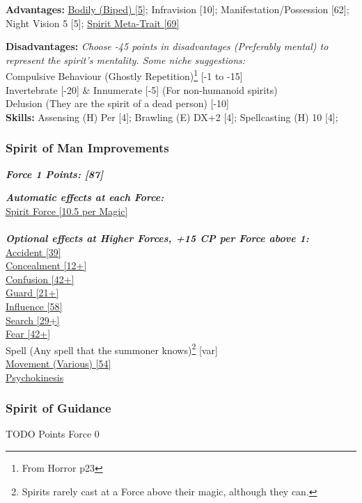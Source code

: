 \begin{multicols*}{3}
	\textbf{Advantages:}
	\hyperref[bodily]{Bodily (Biped) [5]}; Infravision [10]; Manifestation/Possession [62]; Night Vision 5 [5];  \hyperref[spirit_meta_trait]{Spirit Meta-Trait [69]}
	
	\textbf{Disadvantages:}
	\textit{Choose -45 points in disadvantages (Preferably mental) to represent the spirit's mentality. Some niche suggestions:\\}
	Compulsive Behaviour (Ghostly Repetition)\footnote{From Horror p23} [-1 to -15]\\
	Invertebrate [-20] \& Innumerate [-5] (For non-humanoid spirits)\\
	Delusion (They are the spirit of a dead person) [-10]\\
	
	\textbf{Skills:}
	Assensing (H) Per [4]; Brawling (E) DX+2 [4]; Spellcasting (H) 10 [4];
	
	\subsubsection*{Spirit of Man Improvements}
	
	\textbf{\textit{Force 1 Points: [87]}}
	
	\textbf{\textit{Automatic effects at each Force:\\}}
	\hyperref[spirit_force]{Spirit Force [10.5 per Magic]}\\\\
	
	\textbf{\textit{Optional effects at Higher Forces, +15 CP per Force above 1:\\}}
	\hyperref[accident]{Accident [39]}\\
	\hyperref[concealment]{Concealment [12+]}\\
	\hyperref[confusion]{Confusion [42+]}\\
	\hyperref[guard]{Guard [21+]}\\
	\hyperref[influence]{Influence [58]}\\
	\hyperref[search]{Search [29+]}\\
	\hyperref[fear]{Fear [42+]}\\
	Spell (Any spell that the summoner knows)\footnote{Spirits rarely cast at a Force above their magic, although they can.} [var]\\
	\hyperref[movement]{Movement (Various) [54]}\\
	\hyperref[psychokinesis]{Psychokinesis}\\
	
	
	\subsubsection{Spirit of Guidance}
	\begin{flushright}
		TODO Points Force 0
	\end{flushright}
	

\end{multicols*}
